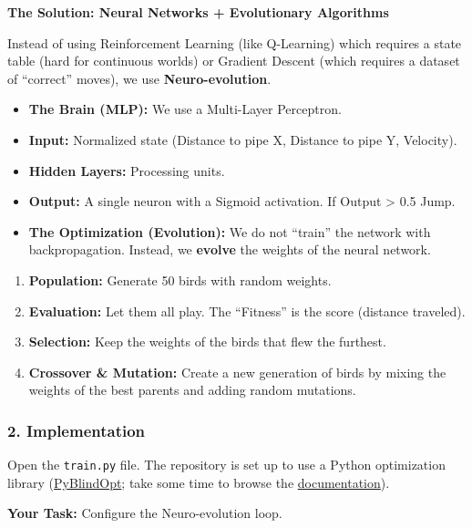 \documentclass[
  12pt,
]{article}
\providecommand{\tightlist}{%
  \setlength{\itemsep}{0pt}\setlength{\parskip}{0pt}}
\begin{document}
\textbf{The Solution: Neural Networks + Evolutionary Algorithms}

Instead of using Reinforcement Learning (like Q-Learning) which requires
a state table (hard for continuous worlds) or Gradient Descent (which
requires a dataset of ``correct'' moves), we use
\textbf{Neuro-evolution}.

\begin{itemize}
\item
  \textbf{The Brain (MLP):} We use a Multi-Layer Perceptron.
\item
  \textbf{Input:} Normalized state (Distance to pipe X, Distance to pipe
  Y, Velocity).
\item
  \textbf{Hidden Layers:} Processing units.
\item
  \textbf{Output:} A single neuron with a Sigmoid activation. If Output
  \textgreater{} 0.5 Jump.
\item
  \textbf{The Optimization (Evolution):} We do not ``train'' the network
  with backpropagation. Instead, we \textbf{evolve} the weights of the
  neural network.
\end{itemize}

\begin{enumerate}
\def\labelenumi{\arabic{enumi}.}
\tightlist
\item
  \textbf{Population:} Generate 50 birds with random weights.
\item
  \textbf{Evaluation:} Let them all play. The ``Fitness'' is the score
  (distance traveled).
\item
  \textbf{Selection:} Keep the weights of the birds that flew the
  furthest.
\item
  \textbf{Crossover \& Mutation:} Create a new generation of birds by
  mixing the weights of the best parents and adding random mutations.
\end{enumerate}

\subsubsection{2. Implementation}\label{implementation}

Open the \texttt{train.py} file. The repository is set up to use a
Python optimization library
(\href{https://pypi.org/project/pyBlindOpt/}{PyBlindOpt}; take some time
to browse the
\href{https://mariolpantunes.github.io/pyBlindOpt/pyBlindOpt.html}{documentation}).

\textbf{Your Task:} Configure the Neuro-evolution loop.
\end{document}
